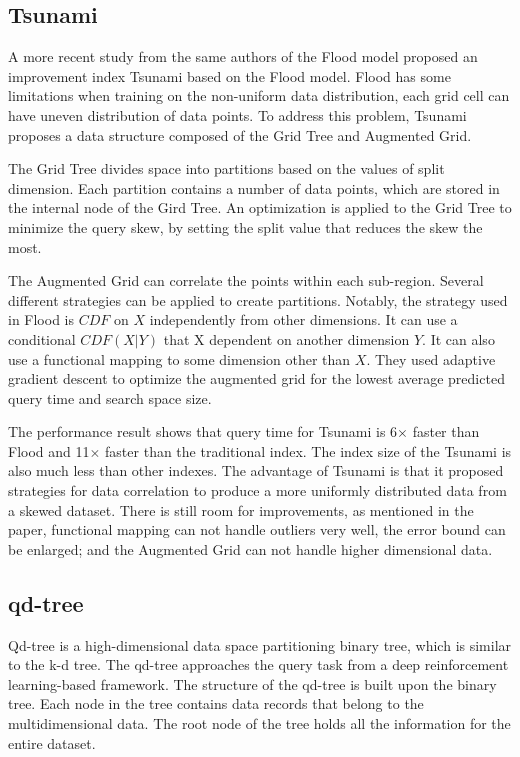 \subsection{Tsunami}
A more recent study from the same authors of the Flood model proposed an improvement index Tsunami \cite{Ding:2020we} based on the Flood model. Flood has some limitations when training on the non-uniform data distribution, each grid cell can have uneven distribution of data points. To address this problem, Tsunami proposes a data structure composed of the Grid Tree and Augmented Grid. 

The Grid Tree divides space into partitions based on the values of split dimension. Each partition contains a number of data points, which are stored in the internal node of the Gird Tree. An optimization is applied to the Grid Tree to minimize the query skew, by setting the split value that reduces the skew the most. 

The Augmented Grid can correlate the points within each sub-region. Several different strategies can be applied to create partitions. Notably, the strategy used in Flood is $CDF$ on $X$ independently from other dimensions. It can use a conditional $CDF(X|Y)$ that X dependent on another dimension $Y$. It can also use a functional mapping to some dimension other than $X$. They used adaptive gradient descent to optimize the augmented grid for the lowest average predicted query time and search space size. 

The performance result shows that query time for Tsunami is 6$\times$ faster than Flood and 11$\times$ faster than the traditional index. The index size of the Tsunami is also much less than other indexes. The advantage of Tsunami is that it proposed strategies for data correlation to produce a more uniformly distributed data from a skewed dataset. There is still room for improvements, as mentioned in the paper, functional mapping can not handle outliers very well, the error bound can be enlarged; and the Augmented Grid can not handle higher dimensional data. 

\subsection{qd-tree}
Qd-tree \cite{Yang:2020ev} is a high-dimensional data space partitioning binary tree, which is similar to the k-d tree. The qd-tree approaches the query task from a deep reinforcement learning-based framework. The structure of the qd-tree is built upon the binary tree. Each node in the tree contains data records that belong to the multidimensional data. The root node of the tree holds all the information for the entire dataset. 

